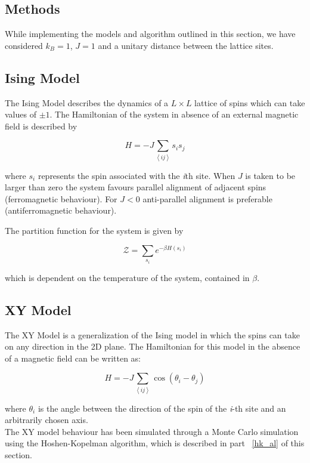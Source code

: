 \documentclass[twoside]{article}
\def\mean#1{\left< #1 \right>}
\begin{document}
\begin{multicols}{2}
\section{Methods}
While implementing the models and algorithm outlined in this section, we have considered $k_B = 1$, $J = 1$ and a unitary distance between the lattice sites.

\subsection{Ising Model}
The Ising Model describes the dynamics of a $L \times L$ lattice of spins which can take values of $\pm 1$. The Hamiltonian of the system in absence of an external magnetic field is described by

\begin{equation}
\label{ising_hamiltonian}
H = - J \sum_{\mean{ij}} s_i s_j
\end{equation}

where $s_i$ represents the spin associated with the \emph{i}th site.
When $J$ is taken to be larger than zero the system favours parallel alignment of adjacent spins (ferromagnetic behaviour). For $J<0$ anti-parallel alignment is preferable (antiferromagnetic behaviour).

The partition function for the system is given by 

\begin{equation}
\mathcal{Z} = \sum_{s_i} e^{-\beta H\left(s_i\right)}
\end{equation}

which is dependent on the temperature of the system, contained in $\beta$. 

\subsection{XY Model}
The XY Model is a generalization of the Ising model in which the spins can take on any direction in the 2D plane. The Hamiltonian for this model in the absence of a magnetic field can be written as:

\begin{equation}
H = -J \sum_{\mean{ij}} \cos(\theta_i - \theta_j)
\end{equation}

where $\theta_i$ is the angle between the direction of the spin of the \emph{i}-th site and an arbitrarily chosen axis. \\
The XY model behaviour has been simulated through a Monte Carlo simulation using the Hoshen-Kopelman algorithm, which is described in part ~\ref{hk_al} of this section.


\end{multicols}
\end{document}
